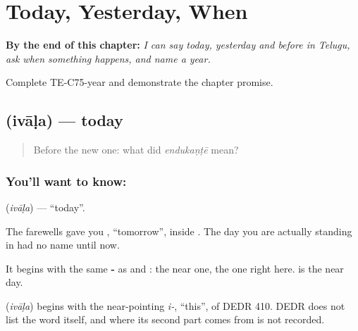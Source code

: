 
\chapter{Today, Yesterday, When}
\label{ch:te-today-yesterday-when}

\begin{chapteropening}
\textbf{By the end of this chapter:} \emph{I can say today, yesterday and before in Telugu, ask when something happens, and name a year.}

Complete TE-C75-year and demonstrate the chapter promise.
\end{chapteropening}

\section[\texorpdfstring{\te{ఇవాళ} (ivāḷa)}{ఇవాళ (ivāḷa)}]{ (ivāḷa) — today}

\label{lesson:TE-C75-today}



\begin{quote}
Before the new one: what did \emph{endukaṇṭē} mean?
\end{quote}

\subsection*{You'll want to know: }
\textbf{} (\emph{ivāḷa}) — \textquotedblleft{}today\textquotedblright{}.

The farewells gave you , \textquotedblleft{}tomorrow\textquotedblright{}, inside  . The day you are actually standing in had no name until now.

It begins with the same \textbf{-} as  and : the near one, the one right here.  is the near day.

\begin{cousinweb}
\textbf{} (\emph{ivāḷa}) begins with the near-pointing \emph{i-}, \textquotedblleft{}this\textquotedblright{}, of DEDR 410. DEDR does not list the word itself, and where its second part comes from is not recorded.
\end{cousinweb}

